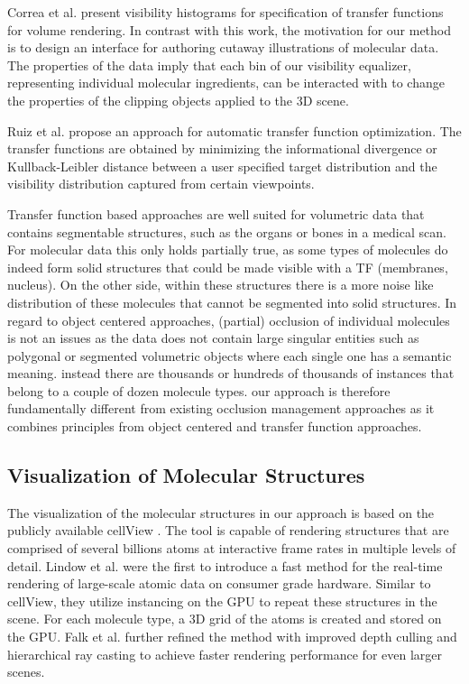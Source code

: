 Correa et al. \cite{correa11} present visibility histograms for specification of transfer functions for volume rendering. In contrast with this work, the motivation for our method is to design an interface for authoring cutaway illustrations of molecular data. The properties of the data imply that each bin of our visibility equalizer, representing individual molecular ingredients, can be interacted with to change the properties of the clipping objects applied to the 3D scene.


Ruiz et al. \cite{ruiz11} propose an approach for automatic transfer function optimization. The transfer functions are obtained by minimizing the informational divergence or Kullback-Leibler distance between a user specified target distribution and the visibility distribution captured from certain viewpoints. 

Transfer function based approaches are well suited for volumetric data that contains segmentable structures, such as the organs or bones in a medical scan. For molecular data this only holds partially true, as some types of molecules do indeed form solid structures that could be made visible with a TF (membranes, nucleus). 	On the other side, within these structures there is a more noise like distribution of these molecules that cannot be segmented into solid structures. 
In regard to object centered approaches, (partial) occlusion of individual molecules is not an issues as the data does not contain large singular entities such as polygonal or segmented volumetric objects where each single one has a semantic meaning. instead there are thousands or hundreds of thousands of instances that belong to a couple of dozen molecule types.
 our approach is therefore fundamentally different from existing occlusion management approaches as it combines principles from object centered and transfer function approaches. 


\subsection{Visualization of Molecular Structures}
The visualization of the molecular structures in our approach is based on the publicly available cellView \cite{muzic15}. The tool is capable of rendering structures that are comprised of several billions atoms at interactive frame rates in multiple levels of detail.  
Lindow et al. \cite{lindow15} were the ﬁrst to introduce a fast method for the real-time rendering of large-scale atomic data on consumer grade hardware. Similar to cellView, they utilize instancing on the GPU to repeat these structures in the scene. For each molecule type, a 3D grid of the atoms is created and stored on the GPU. Falk et al. \cite{falk13} further refined the method with improved depth culling and hierarchical ray casting to achieve faster rendering performance for even larger scenes. 


